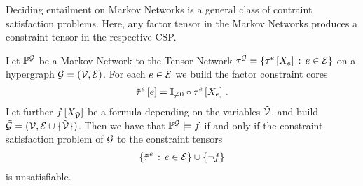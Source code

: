 
Deciding entailment on Markov Networks is a general class of contraint satisfaction problems.
Here, any factor tensor in the Markov Networks produces a constraint tensor in the respective CSP.

\begin{theorem}
    \label{the:factorReduction}
    Let $\mathbb{P}^{\mathcal{G}}$ be a Markov Network to the Tensor Network $\tau^{\mathcal{G}}=\left\{\tau^{e}\left[X_{e}\right]\,:\,e\in\mathcal{E}\right\}$ on a hypergraph $\mathcal{G}=(\mathcal{V},\mathcal{E})$. %
    For each $e\in\mathcal{E}$ we build the factor constraint cores
    \begin{align*}
        \tilde{\tau}^{e}\left[e\right] = \mathbb{I}_{\neq0}\circ\tau^{e}\left[X_{e}\right] \, .
    \end{align*}
    Let further $f\left[X_{\tilde{\mathcal{V}}}\right]$ be a formula depending on the variables $\tilde{\mathcal{V}}$, and build $\tilde{\mathcal{G}}=(\mathcal{V},\mathcal{E}\cup\{\tilde{\mathcal{V}}\})$.
    Then we have that $\mathbb{P}^{\mathcal{G}}\models f$ if and only if the constraint satisfaction problem of $\tilde{\mathcal{G}}$ to the constraint tensors
    \begin{align*}
        \{\tilde{\tau}^{e} \,:\, e\in\mathcal{E} \} \cup \{\lnot f \}
    \end{align*}
    is unsatisfiable.
\end{theorem}

